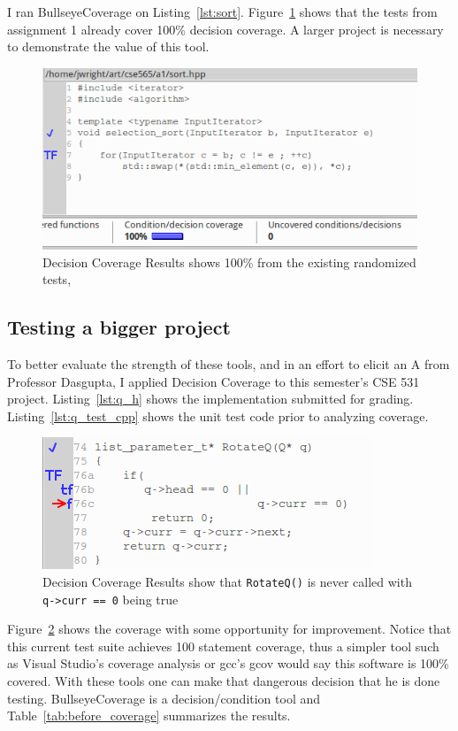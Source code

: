 \documentclass[12pt,journal]{article}
\begin{document}
I ran BullseyeCoverage on Listing~\ref{lst:sort}. Figure~\ref{fig:sort_coverage}
shows that the tests from assignment 1 already cover 100\% decision coverage.
A larger project is necessary to demonstrate the value of this tool.

\begin{figure}
    \centering
    \includegraphics[width=0.8\columnwidth]{100percent_coverage.png}
    \caption{Decision Coverage Results shows 100\% from the existing randomized
        tests,}
    \label{fig:sort_coverage}
\end{figure}

\subsection{Testing a bigger project}
To better evaluate the strength of these tools, and in an effort to elicit an
A from Professor Dasgupta, I applied Decision Coverage to this semester's CSE
531 project.  Listing~\ref{lst:q_h} shows the implementation submitted for
grading.  Listing~\ref{lst:q_test_cpp} shows the unit test code prior to
analyzing coverage. 

\begin{figure}
    \centering
    \includegraphics[width=0.8\columnwidth]{missed_decision_coverage.png}
    \caption{Decision Coverage Results show that {\tt RotateQ()} is never called
    with {\tt q->curr == 0} being true}
    \label{fig:decision_coverage_before}
\end{figure}

Figure~\ref{fig:decision_coverage_before} shows the coverage with some
opportunity for improvement. Notice that this current test suite achieves 100%
statement coverage, thus a simpler tool such as Visual Studio's coverage
analysis or gcc's gcov would say this software is 100\% covered. With these
tools one can make that dangerous decision that he is done testing.
BullseyeCoverage is a decision/condition tool and
Table~\ref{tab:before_coverage} summarizes the results. 
\end{document}
